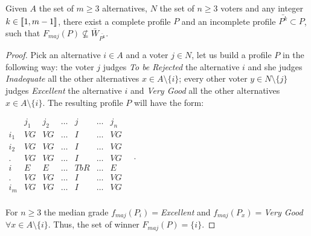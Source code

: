 \documentclass[version=3.21, pagesize, twoside=off, bibliography=totoc, DIV=calc, fontsize=12pt, a4paper]{scrartcl}
\begin{document}
\begin{proposition}
	\label{prop:notsamewinner}
	Given $A$ the set of $m\geq 3$ alternatives, $N$ the set of $n\geq3$ voters and any integer $k \in \llbracket1,m-1\rrbracket$, there exist a complete profile $P$ and an incomplete profile $\bar{P^k} \subset P$, such that $F_{maj}(P) \nsubseteq \bar{W}_{\bar{P^k}}$.
\end{proposition}
\begin{proof}
	Pick an alternative $i\in A$ and a voter $j \in N$, let us build a profile $P$ in the following way: the voter $j$ judges \textit{To be Rejected} the alternative $i$ and she judges \textit{Inadequate} all the other alternatives $x \in A \setminus \{i\}$; every other voter $y\in N \setminus \{j\}$ judges \textit{Excellent} the alternative $i$ and \textit{Very Good} all the other alternatives $x \in A \setminus \{i\}$. The resulting profile $P$ will have the form:
	\begin{center}
		$
		\begin{array}{ccccccc}
			& j_1 & j_2 & \dots & j & \dots & j_n \\
			i_1 &	VG & VG & \dots & I & \dots & VG \\
			i_2 &	VG & VG & \dots & I & \dots & VG \\
			. &	VG & VG & \dots & I & \dots & VG \\
			i &	E & E & \dots & TbR & \dots & E \\
			. &	VG & VG & \dots & I & \dots & VG \\
			i_m &	VG & VG & \dots & I & \dots & VG \\
		\end{array} \quad.
		$
	\end{center}
	For $n\geq 3$ the median grade $f_{maj}(P_i)=$\textit{Excellent} and $f_{maj}(P_x)=$\textit{Very Good} $\forall x \in A \setminus \{i\}$. Thus, the set of winner $F_{maj}(P)=\{i\}$.
	

\end{proof}
\end{document}
